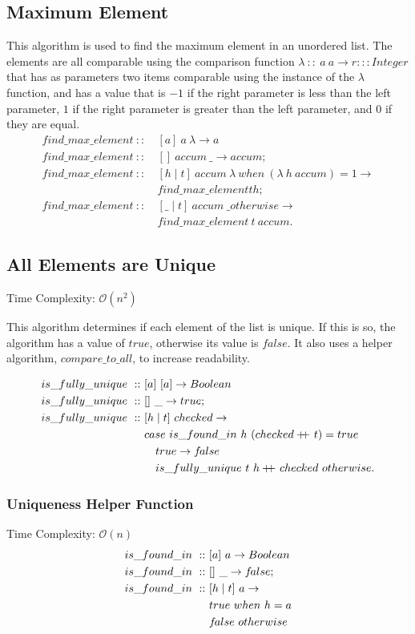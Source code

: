 \documentclass[a4paper,10pt]{book}
\newcommand\doubleplus{+\kern-1.3ex+\kern0.8ex}
\newcommand{\false}{f\kern-0.25ex{alse}}
\begin{document}
\subsection{Maximum Element}
This algorithm is used to find the maximum element in an unordered list. The elements are all comparable using the comparison function $\lambda\ ::\ a\ a\rightarrow r:::Integer$ that has as parameters two items comparable using the instance of the $\lambda$ function, and has a value that is $-1$ if the right parameter is less than the left parameter, $1$ if the right parameter is greater than the left parameter, and $0$ if they are equal.  
\begin{align*}
find\_max\_element\ ::\ &[a]\ a\ \lambda\rightarrow a\\
find\_max\_element\ ::\ &[]\ accum\ \_\rightarrow accum;\\
find\_max\_element\ ::\ &[h\mid t]\ accum\ \lambda\ when\ (\lambda\ h\ accum) = 1\rightarrow\\
	&find\_max\_element t h;\\
find\_max\_element\ ::\ &[\_\mid t]\ accum\ \_ otherwise\rightarrow\\
	&find\_max\_element\ t\ accum.
\end{align*}

\subsection{All Elements are Unique}
Time Complexity: $\mathcal{O}(n^2)$

This algorithm determines if each element of the list is unique. If this is so, the algorithm has a value of $true$, otherwise its value is $false$. It also uses a helper algorithm, $compare\_to\_all$, to increase readability.

\begin{align*}
is\_fully\_unique\ ::\ &[a]\ [a]\rightarrow Boolean\\
is\_fully\_unique\ ::\ &[]\ \_\rightarrow true;\\
is\_fully\_unique\ ::\ &[h\mid t]\ checked\rightarrow\\
	&case\ is\_found\_in\ h\ (checked\doubleplus t)=true\\
	&\quad true\rightarrow\false\ \\
	&\quad is\_fully\_unique\ t\ h\doubleplus checked\ otherwise.
\end{align*}
\subsubsection{Uniqueness Helper Function}
Time Complexity: $\mathcal{O}(n)$
\begin{align*}
is\_found\_in\ ::\ &[a]\ a\rightarrow Boolean\\
is\_found\_in\ ::\ &[]\ \_\rightarrow \false;\\
is\_found\_in\ ::\ &[h\mid t]\ a\rightarrow\\
	&true\ when\ h=a\\
	&\false\ otherwise
\end{align*}
\end{document}
